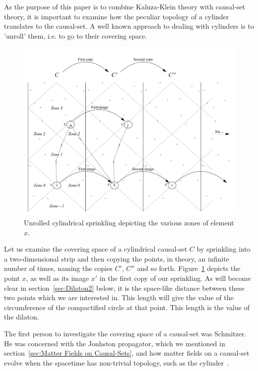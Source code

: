 \documentclass[a4paper,12pt]{article}
\numberwithin{equation}{section}
\begin{document}
As the purpose of this paper is to combine Kaluza-Klein theory with causal-set theory, it is important to examine how the peculiar topology of a cylinder translates to the causal-set. A well known approach to dealing with cylinders is to 'unroll' them, i.e. to go to their covering space.
\vspace{-4mm}
\begin{figure}[h]
\begin{center}
\leavevmode
\includegraphics[scale=.44]{Graph14.pdf}
\caption{Unrolled cylindrical sprinkling depicting the various zones of element $x$.}
\label{fig:Graph14}
\end{center}
\end{figure}

 Let us examine the covering space of a cylindrical causal-set $C$ by sprinkling into a two-dimensional strip and then copying the points, in theory, an infinite number of times, naming the copies $C'$, $C''$ and so forth. Figure~\ref{fig:Graph14} depicts the point $x$, as well as its image $x'$ in the first copy of our sprinkling. As will become clear in section~\ref{sec:Dilaton2} below, it is the space-like distance between these two points which we are interested in. This length will give the value of the circumference of the compactified circle at that point. This length is the value of the dilaton.

The first person to investigate the covering space of a causal-set was Schmitzer. He was concerned with the Jonhston propagator, which we mentioned in section~\ref{sec:Matter Fields on Causal-Sets}, and how matter fields on a causal-set evolve when the spacetime has non-trivial topology, such as the cylinder~\cite{Schmitzer2010}.
\end{document}
